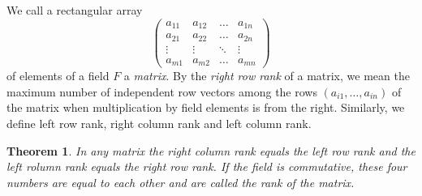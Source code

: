 \documentclass[11pt]{article}
\newtheorem{theo}{Theorem}
\theoremstyle{definition}
\begin{document}
We call a rectangular array
\[
\begin{pmatrix}
a_{11} & a_{12} & \ldots & a_{1n}
\\
a_{21} & a_{22} & \ldots & a_{2n}
\\
\vdots & \vdots & \ddots & \vdots
\\
a_{m1} & a_{m2} & \ldots & a_{mn}
\end{pmatrix}
\]
of elements of a field $F$ a \emph{matrix}.
By the \emph{right row rank} of a matrix, we mean the maximum number of independent row vectors among the rows $(a_{i1}, \ldots, a_{in})$ of the matrix when multiplication by field elements is from the right.
Similarly, we define left row rank, right column rank and left column rank.


\begin{theo}
\label{theo:fo}
In any matrix the right column rank equals the left row rank and the left rolumn rank equals the right row rank.
If the field is commutative, these four numbers are equal to each other and are called the rank of the matrix.
\end{theo}
\end{document}
